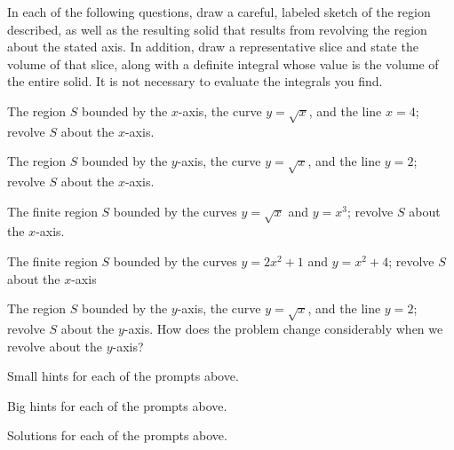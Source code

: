\begin{activity} \label{A:6.2.1}  
In each of the following questions, draw a careful, labeled sketch of the region described, as well as the resulting solid that results from revolving the region about the stated axis.  In addition, draw a representative slice and state the volume of that slice, along with a definite integral whose value is the volume of the entire solid.  It is not necessary to evaluate the integrals you find.
\ba
	\item The region $S$ bounded by the $x$-axis, the curve $y = \sqrt{x}$, and the line $x = 4$; revolve $S$ about the $x$-axis.
	\item The region $S$ bounded by the $y$-axis, the curve $y = \sqrt{x}$, and the line $y = 2$; revolve $S$ about the $x$-axis.
	\item The finite region $S$ bounded by the curves $y = \sqrt{x}$ and $y = x^3$; revolve $S$ about the $x$-axis.	
	\item The finite region $S$ bounded by the curves $y = 2x^2 + 1$ and $y  = x^2 + 4$; revolve $S$ about the $x$-axis
	\item The region $S$ bounded by the $y$-axis, the curve $y = \sqrt{x}$, and the line $y = 2$; revolve $S$ about the $y$-axis.  How does the problem change considerably when we revolve about the $y$-axis?
\ea
\end{activity}
\begin{smallhint}
\ba
	\item Small hints for each of the prompts above.
\ea
\end{smallhint}
\begin{bighint}
\ba
	\item Big hints for each of the prompts above.
\ea
\end{bighint}
\begin{activitySolution}
\ba
	\item Solutions for each of the prompts above.
\ea
\end{activitySolution}
\aftera

